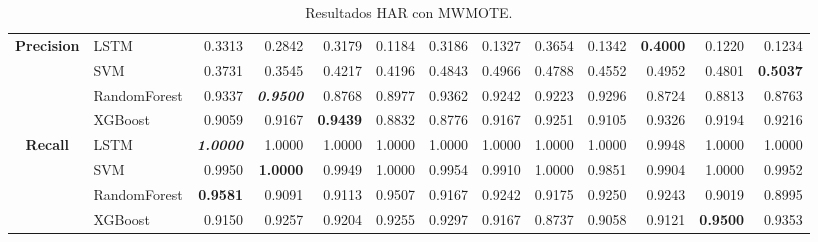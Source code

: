 \begin{table}[H]
\begin{adjustbox}{max width=14cm}
\begin{tabular}{|c|l|r|r|r|r|r|r|r|r|r|r|r|}
			\hline
			\textbf{Precision} &  LSTM &  0.3313 &  0.2842 &  0.3179 &  0.1184 &  0.3186 &  0.1327 &  0.3654 &  0.1342 & \textbf{  0.4000 } &  0.1220 &  0.1234 \\
			&  SVM &  0.3731 &  0.3545 &  0.4217 &  0.4196 &  0.4843 &  0.4966 &  0.4788 &  0.4552 &  0.4952 &  0.4801 & \textbf{  0.5037 } \\
			&  RandomForest &  0.9337 & \textit{ \textbf{  0.9500 } } &  0.8768 &  0.8977 &  0.9362 &  0.9242 &  0.9223 &  0.9296 &  0.8724 &  0.8813 &  0.8763 \\
			&  XGBoost &  0.9059 &  0.9167 & \textbf{  0.9439 } &  0.8832 &  0.8776 &  0.9167 &  0.9251 &  0.9105 &  0.9326 &  0.9194 &  0.9216 \\
			\hline
			\textbf{Recall} &  LSTM & \textit{ \textbf{  1.0000 } } &  1.0000 &  1.0000 &  1.0000 &  1.0000 &  1.0000 &  1.0000 &  1.0000 &  0.9948 &  1.0000 &  1.0000 \\
			&  SVM &  0.9950 & \textbf{  1.0000 } &  0.9949 &  1.0000 &  0.9954 &  0.9910 &  1.0000 &  0.9851 &  0.9904 &  1.0000 &  0.9952 \\
			&  RandomForest & \textbf{  0.9581 } &  0.9091 &  0.9113 &  0.9507 &  0.9167 &  0.9242 &  0.9175 &  0.9250 &  0.9243 &  0.9019 &  0.8995 \\
			&  XGBoost &  0.9150 &  0.9257 &  0.9204 &  0.9255 &  0.9297 &  0.9167 &  0.8737 &  0.9058 &  0.9121 & \textbf{  0.9500 } &  0.9353 \\
			\hline
		\end{tabular}
	\end{adjustbox}
	\caption{Resultados HAR con MWMOTE.}
	\label{tab:HAR_MWMOTE}
\end{table}

